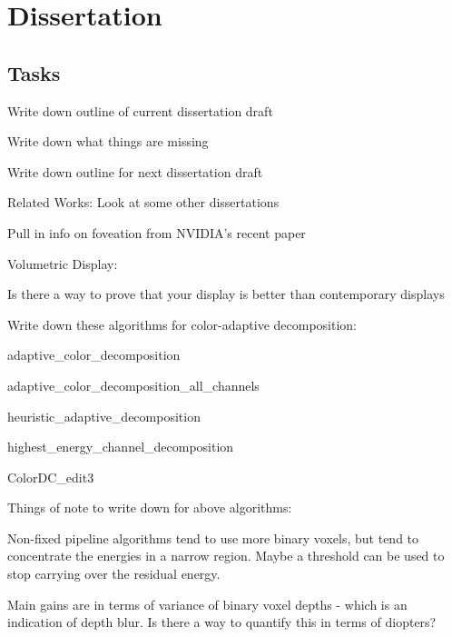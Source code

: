 \chapter{Dissertation}

\section{Tasks}
\begin{todolist}
\item Write down outline of current dissertation draft
\item Write down what things are missing
\item Write down outline for next dissertation draft
\item Related Works: Look at some other dissertations
    \begin{compact_todolist}
    \item Pull in info on foveation from NVIDIA's recent paper
    \end{compact_todolist}
\item Volumetric Display:
    \begin{compact_todolist}
    \item Is there a way to prove that your display is better than contemporary displays
    \end{compact_todolist}
\item Write down these algorithms for color-adaptive decomposition:
    \begin{todolist}
    \item adaptive\_color\_decomposition
    \item adaptive\_color\_decomposition\_all\_channels
    \item heuristic\_adaptive\_decomposition
    \item highest\_energy\_channel\_decomposition
    \item ColorDC\_edit3
    \end{todolist}
\item Things of note to write down for above algorithms:
    \begin{todolist}
    \item Non-fixed pipeline algorithms tend to use more binary voxels, but tend to concentrate the energies in a narrow region. Maybe a threshold can be used to stop carrying over the residual energy. 
    \item Main gains are in terms of variance of binary voxel depths - which is an indication of depth blur. Is there a way to quantify this in terms of diopters?

\end{todolist}
\end{todolist}
